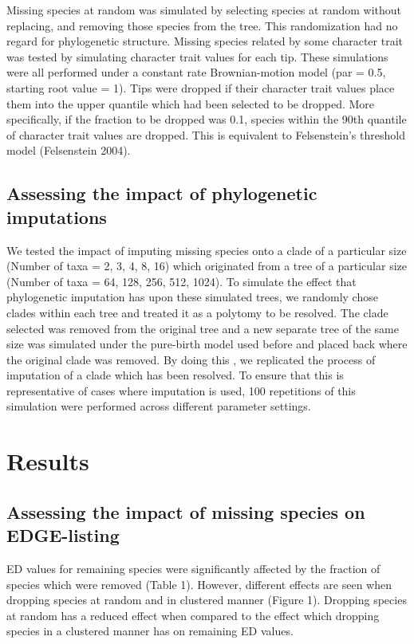 \documentclass[12pt,english]{article}
\begin{document}
Missing species at random was simulated by selecting species at random
without replacing, and removing those species from the tree. This
randomization had no regard for phylogenetic structure. Missing
species related by some character trait was tested by simulating
character trait values for each tip. These simulations were all
performed under a constant rate Brownian-motion model (par = 0.5,
starting root value = 1). Tips were dropped if their character trait
values place them into the upper quantile which had been selected to
be dropped. More specifically, if the fraction to be dropped was 0.1,
species within the 90th quantile of character trait values are
dropped. This is equivalent to Felsenstein’s threshold model
(Felsenstein 2004).

\subsection*{Assessing the impact of phylogenetic imputations}
We tested the impact of imputing missing species onto a clade of a
particular size (Number of taxa = 2, 3, 4, 8, 16) which originated
from a tree of a particular size (Number of taxa = 64, 128, 256, 512,
1024). To simulate the effect that phylogenetic imputation has upon
these simulated trees, we randomly chose clades within each tree and
treated it as a polytomy to be resolved. The clade selected was
removed from the original tree and a new separate tree of the same
size was simulated under the pure-birth model used before and placed
back where the original clade was removed. By doing this , we
replicated the process of imputation of a clade which has been
resolved. To ensure that this is representative of cases where
imputation is used, 100 repetitions of this simulation were performed
across different parameter settings.

\section*{Results}
\subsection*{Assessing the impact of missing species on EDGE-listing}

ED values for remaining species were significantly affected by the
fraction of species which were removed (Table 1). However, different
effects are seen when dropping species at random and in clustered
manner (Figure 1). Dropping species at random has a reduced effect
when compared to the effect which dropping species in a clustered
manner has on remaining ED values.
\end{document}
